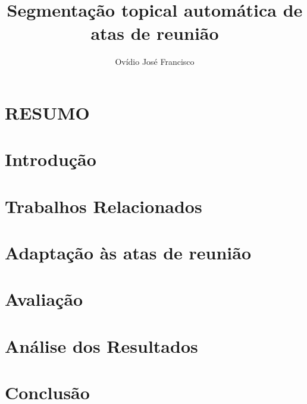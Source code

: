 \documentclass{sig-alternate-05-2015}
\begin{document}
\title{Segmentação topical automática de atas de reunião}



\author{
\alignauthor Ovídio José Francisco\\
}

\maketitle

%

\section*{RESUMO}



\keywords{}

\begingroup
\let\clearpage\relax

\section{Introdução}
	\label{sec:introducao}
	

\section{Trabalhos Relacionados}
	\label{sec:trabalhos}
	

\section{Adaptação às atas de reunião}
	\label{sec:adaptacaoasatas}
		

\section{Avaliação}
	\label{sec:avaliacao}
	
	
\section{Análise dos Resultados}
	\label{sec:resultados}
	
	
\section{Conclusão}
	\label{sec:conclusao}
	
\endgroup




	
\pagestyle{empty}
 	\label{sec:anexo}
 	
\end{document}
